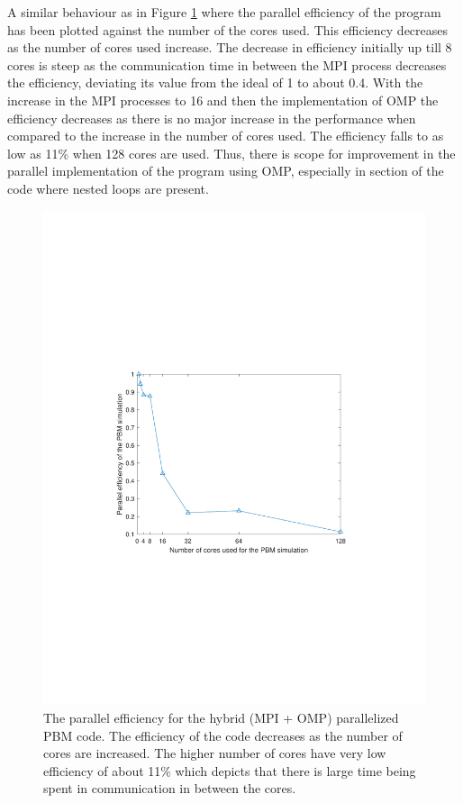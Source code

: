 \documentclass[preprint,11pt,authoryear]{elsarticle}
\begin{document}
A similar behaviour as in Figure \ref{fig:rslts_PBM_parallel_efficiency} where the parallel 
efficiency of the program has been plotted against the number of the cores used. This efficiency 
decreases as the number of cores used increase. The decrease in efficiency initially up till 8 cores is steep as 
the communication time in between the MPI process decreases the efficiency, deviating its value from 
the ideal of 1 to about 0.4. With the increase in the MPI processes to 16 and then the 
implementation of OMP the efficiency decreases as there is no major increase in the performance 
when compared to the increase in the number of cores used. The efficiency falls to as low as 11\% 
when 128 cores are used. Thus, there is scope for improvement in the parallel implementation 
of the program using OMP, especially in section of the code where nested loops are present.

\begin{figure}
\centering
\includegraphics[scale=0.75]{rslsts_PBM_efficiency.pdf}
\caption{The parallel efficiency for the hybrid (MPI + OMP) parallelized PBM code. The efficiency of the 
code decreases as the number of cores are increased. The higher number of cores have very low 
efficiency of about 11\% which depicts that there is large time being spent in communication in 
between the cores.}
\label{fig:rslts_PBM_parallel_efficiency}
\end{figure}
\end{document}
